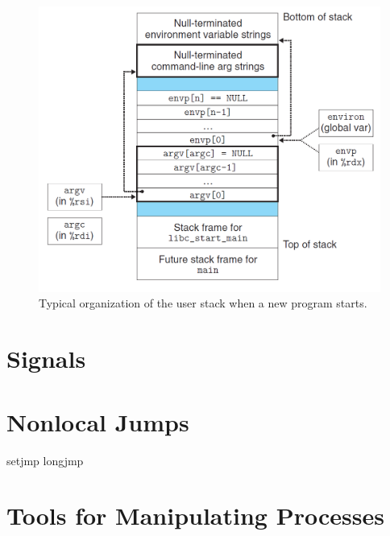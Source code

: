 \begin{figure}[h!]
    \centering
    \includegraphics[scale=0.5]{pic/section8/pic3}
    \caption{Typical organization of the user stack when a    new program starts.}
\end{figure}



\section{Signals}


\section{Nonlocal Jumps}

setjmp longjmp

\section{Tools for Manipulating Processes}
